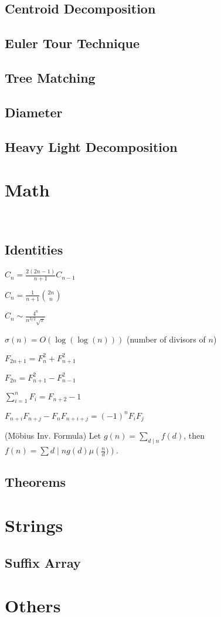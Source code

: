 	\subsection{Centroid Decomposition}
	\subsection{Euler Tour Technique}
	\subsection{Tree Matching}
	\subsection{Diameter}
	\subsection{Heavy Light Decomposition}
	
	\section{Math}
	\
	\subsection{Identities}
	{
		$C_n = \frac{2(2n-1)}{n+1} C_{n-1}$
		
		$C_n = \frac{1}{n+1} \binom{2n}{n}$
		
		$C_n \sim \frac{4^n}{n^{3/2}\sqrt{\pi}}$
		
		$\sigma(n) = O(\log(\log(n)))$ (number of divisors of $n$)
		
		$F_{2n+1} = F_{n}^2 + F_{n+1}^2$
		
		$F_{2n} = F_{n+1}^2 - F_{n-1}^2$
		
		$\sum_{i=1}^n F_i = F_{n+2}-1$
		
		$F_{n+i}F_{n+j} - F_nF_{n+i+j} = (-1)^n F_iF_j$
		
		(Möbius Inv. Formula)
		Let $g(n) = \sum_{d\mid n} f(d)$, then $f(n)=\sum{d\mid n} g(d) \mu\left(\frac{n}{d})\right)$.
	}
	\subsection{Theorems}
	
	
	\section{Strings}
	\subsection{Suffix Array}
	
	
	
	\section{Others}
	
	
